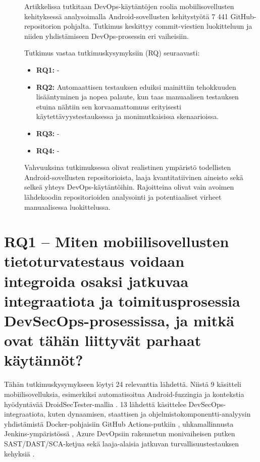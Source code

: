 \documentclass[bscthesis,finnish,oneside,biblatex]{uefcsthesis}
\begin{document}
\begin{description}
    \item[\cite{eramo2024empirical}] Artikkelissa tutkitaan DevOps-käytäntöjen roolia mobiilisovellusten kehityksessä analysoimalla Android-sovellusten kehitystyötä 7 441 GitHub-repositorion pohjalta. Tutkimus keskittyy commit-viestien luokitteluun ja niiden yhdistämiseen DevOps-prosessin eri vaiheisiin.

    Tutkimus vastaa tutkimuskysymyksiin (RQ) seuraavasti:
    \begin{itemize}
        \item \textbf{RQ1:} -
        \item \textbf{RQ2:} Automaattisen testauksen eduiksi mainittiin tehokkuuden lisääntyminen ja nopea palaute, kun taas manuaalisen testauksen etuina nähtiin sen korvaamattomuus erityisesti käytettävyystestauksessa ja monimutkaisissa skenaarioissa.
        \item \textbf{RQ3:} -
        \item \textbf{RQ4:} -
    \end{itemize}

    Vahvuuksina tutkimuksessa olivat realistinen ympäristö todellisten Android-sovellusten repositorioista, laaja kvantitatiivinen aineisto sekä selkeä yhteys DevOps-käytäntöihin. Rajoitteina olivat vain avoimen lähdekoodin repositorioiden analysointi ja potentiaaliset virheet manuaalisessa luokittelussa.
\end{description}

\section{RQ1 – Miten mobiilisovellusten tietoturvatestaus voidaan integroida osaksi jatkuvaa integraatiota ja toimitusprosessia DevSecOps-prosessissa, ja mitkä ovat tähän liittyvät parhaat käytännöt?}
\label{sec:rq1}

Tähän tutkimuskysymykseen löytyi 24 relevanttia lähdettä. Niistä 9 käsitteli mobiilisovelluksia, esimerkiksi automatisoitua Android-fuzzingia \cite{schneider_2020_fuzzing} ja kontekstia hyödyntävää DroidSecTester-mallia \cite{baheux2023_droidsectester}. 13 lähdettä käsittelee DevSecOps-integraatiota, kuten dynaamisen, staattisen ja ohjelmistokomponentti-analyysin yhdistämistä Docker-pohjaisiin GitHub Actions-putkiin \cite{marandi2023_ias}, uhkamallinnusta Jenkins-ympäristössä \cite{nikolov2024_fit}, Azure DevOpsiin rakennetun monivaiheisen putken SAST/DAST/SCA-ketjua \cite{kushwaha2024_cct} sekä laaja-alaisia jatkuvan turvallisuustestauksen kehyksiä \cite{feio2024_empirical,aljohani2023_automating}.
\end{document}
